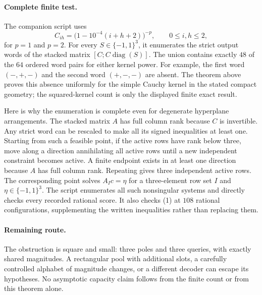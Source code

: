 \documentclass[11pt]{article}
\begin{document}
\paragraph{Complete finite test.}
The companion script uses
\[
 C_{ih}=\bigl(1-10^{-4}(i+h+2)\bigr)^{-p},
 \qquad 0\leq i,h\leq2,
\]
for $p=1$ and $p=2$. For every $S\in\{-1,1\}^3$, it enumerates
the strict output words of the stacked matrix
$[C;C\operatorname{diag}(S)]$. The union contains exactly $48$
of the $64$ ordered word pairs for either kernel power. For example,
the first word $(-,+,-)$ and the second word $(+,-,-)$ are absent.
The theorem above proves this absence uniformly for the simple
Cauchy kernel in the stated compact geometry; the squared-kernel
count is only the displayed finite exact result.

Here is why the enumeration is complete even for degenerate
hyperplane arrangements. The stacked matrix $A$ has full column
rank because $C$ is invertible. Any strict word can be rescaled to
make all its signed inequalities at least one. Starting from such
a feasible point, if the active rows have rank below three, move
along a direction annihilating all active rows until a new
independent constraint becomes active. A finite endpoint exists in
at least one direction because $A$ has full column rank. Repeating
gives three independent active rows. The corresponding point solves
$A_Ic=\eta$ for a three-element row set $I$ and
$\eta\in\{-1,1\}^3$. The script enumerates all such nonsingular
systems and directly checks every recorded rational score. It also
checks (1) at $108$ rational configurations, supplementing the
written inequalities rather than replacing them.

\paragraph{Remaining route.}
The obstruction is square and small: three poles and three queries,
with exactly shared magnitudes. A rectangular pool with additional
slots, a carefully controlled alphabet of magnitude changes, or a
different decoder can escape its hypotheses. No asymptotic capacity
claim follows from the finite count or from this theorem alone.
\end{document}
